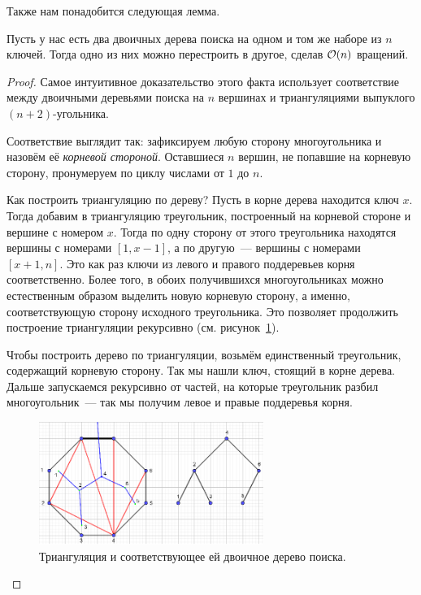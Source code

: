 Также нам понадобится следующая лемма.

\begin{lemma}\label{tree_distance} Пусть у нас есть два двоичных дерева поиска на одном и том же наборе из $n$ ключей. Тогда одно из них можно перестроить в другое, сделав $\mathcal{O}(n)$ вращений.
\end{lemma}
\begin{proof} Самое интуитивное доказательство этого факта использует соответствие
между двоичными деревьями поиска на $n$ вершинах и триангуляциями выпуклого $(n + 2)$-угольника.

Соответствие выглядит так: зафиксируем любую сторону многоугольника и назовём её \emph{корневой стороной}. Оставшиеся $n$ вершин, не попавшие на корневую сторону,
пронумеруем по циклу числами от $1$ до $n$. 

Как построить триангуляцию по дереву?
Пусть в корне дерева находится ключ $x$. Тогда добавим в триангуляцию треугольник, построенный на корневой стороне и вершине с номером $x$. Тогда по одну сторону от этого
треугольника находятся вершины с номерами $[1, x - 1]$, а по другую~--- 
вершины с номерами $[x + 1, n]$. Это как раз ключи из левого и правого поддеревьев
корня соответственно. Более того, в обоих получившихся многоугольниках можно естественным образом выделить новую корневую сторону, а именно, соответствующую сторону исходного треугольника. Это позволяет продолжить построение триангуляции рекурсивно (см. рисунок~\ref{triangulation_tree}).

Чтобы построить дерево по триангуляции, возьмём единственный треугольник, содержащий корневую сторону. Так мы нашли ключ, стоящий в корне дерева. Дальше запускаемся рекурсивно от частей, на которые треугольник разбил многоугольник~--- так мы получим левое и правые поддеревья корня. 
\begin{figure}
\includegraphics[height=4cm]{img/tree_and_triangulation.png}
\caption{Триангуляция и соответствующее ей двоичное дерево поиска.}
\label{triangulation_tree}
\end{figure}


\end{proof}
